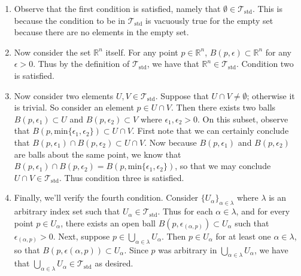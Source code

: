 \documentclass[letterpaper,12pt,twoside]{maths}
\begin{document}
\begin{solution}
    \begin{enumerate}
        \item Observe that the first condition is satisfied, namely that $\emptyset
        \in \mathscr{T}_{\text{std}}.$ This is because the condition to be in
        $\mathscr{T}_{\text{std}}$ is vacuously true for the empty set because
        there are no elements in the empty set. 
    
        \item Now consider the set $\mathbb{R}^n$ itself. 
        For any point $p \in
        \mathbb{R}^n$, $B(p, \epsilon) \subset \mathbb{R}^n$ for
        any $\epsilon > 0$. Thus by the definition of
        $\mathscr{T}_{\text{std}}$,
        we have that $\mathbb{R}^n \in
        \mathscr{T}_{\text{std}}$. Condition two is satisfied.
    
        \item Now consider two elements $U, V \in \mathscr{T}_{\text{std}}$. Suppose
        that $U \cap V \ne \emptyset$; otherwise it is trivial. So consider an
        element $p \in U \cap  V.$ Then there exists two balls $B(p,
        \epsilon_1) \subset U$ and $B(p, \epsilon_2) \subset V$ where
        $\epsilon_1, \epsilon_2 > 0$. On this subset, observe that $B(p,
        \text{min}\{\epsilon_1, \epsilon_2\}) \subset U\cap V.$ First note
        that we can certainly conclude that $B(p,\epsilon_1) \cap B(p,
        \epsilon_2) \subset U \cap V.$ Now because $B(p,\epsilon_1)$ and $B(p,
        \epsilon_2)$ are balls about the same point, we know that
        $B(p,\epsilon_1) \cap B(p, \epsilon_2) = B(p, \text{min}\{\epsilon_1,
        \epsilon_2\})$, so that we may conclude $U\cap V \in
        \mathscr{T}_{\text{std}}$. Thus condition three is satisfied. 
        
        \item  Finally, we'll verify the fourth condition. Consider 
        $\{U_{\alpha} \}_{\alpha \in \lambda}$ where
        $\lambda$ is an arbitrary index set such that $U_\alpha \in
        \mathscr{T}_{\text{std}}$. Thus for each $\alpha \in \lambda$, and for
        every point $p \in U_\alpha$, there exists an open ball $B(p,
        \epsilon_{(\alpha, p)}) \subset U_\alpha$ such that
        $\epsilon_{(\alpha, p)} > 0$.
        Next, suppose $p \in 
    \bigcup\limits_{\alpha \in
    \lambda} U_\alpha$. Then $p \in U_\alpha$ for at least one $\alpha \in
        \lambda$, so that $B(p, \epsilon(\alpha, p)) \subset U_\alpha$.
        Since $p$ was arbitrary in $\bigcup\limits_{\alpha \in
        \lambda} U_\alpha$, we have that $\bigcup\limits_{\alpha \in
        \lambda} U_\alpha \in \mathscr{T}_{\text{std}}$ as desired. 
    \end{enumerate}
\end{solution}
\end{document}

